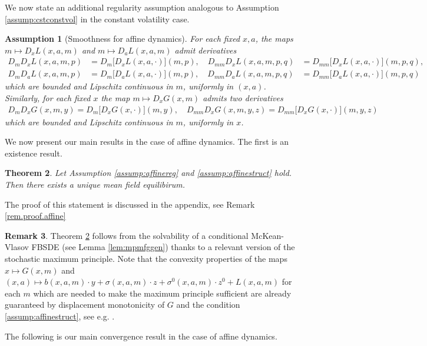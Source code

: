 \documentclass[11pt,reqno]{amsart}
\numberwithin{equation}{section}
\newtheorem{theorem}{Theorem}[section]
\newtheorem{assumption}[theorem]{Assumption}
\theoremstyle{definition}
\newtheorem{remark}[theorem]{Remark}
\begin{document}
We now state an additional regularity assumption analogous to Assumption \ref{assump:cstconstvol} in the constant volatility case.

\begin{assumption}[Smoothness for affine dynamics] \label{assump:cstaffine}
For each fixed $x,a$, the maps $m \mapsto D_x  L(x,a,m)$ and $m \mapsto D_a L(x,a,m)$ admit derivatives 
\begin{align*}
D_m D_x L(x,a,m,p) &= D_m\big[D_x L(x,a,\cdot)](m,p), \quad 
D_{mm} D_x L(x,a,m,p,q) &= D_{mm} \big[D_x L(x,a,\cdot)\big](m,p,q),
\\
D_m D_a L(x,a,m,p) &= D_m\big[D_a L(x,a,\cdot)](m,p), \quad 
D_{mm} D_a L(x,a,m,p,q) &= D_{mm} \big[D_a L(x,a,\cdot)\big](m,p,q)
\end{align*}
which are bounded and Lipschitz continuous in $m$, uniformly in $(x,a)$. Similarly, for each fixed $x$ the map $m \mapsto D_x G(x,m)$ admits two derivatives 
\begin{align*}
D_m D_x G(x,m,y) = D_m\big[D_x G(x,\cdot)](m,y), \quad D_{mm} D_x G(x,m,y,z) = D_{mm} \big[D_x G(x,\cdot)\big](m,y,z)
\end{align*}
which are bounded and Lipschitz continuous in $m$, uniformly in $x$. 
\end{assumption}

We now present our main results in the case of affine dynamics. The first is an existence result.


\begin{theorem} \label{thm:existenceaffine}
Let Assumption \ref{assump:affinereg} and \ref{assump:affinestruct} hold. Then there exists a unique mean field equilibirum.
\end{theorem}

The proof of this statement is discussed in the appendix, see Remark \ref{rem.proof.affine}
\begin{remark}
  Theorem \ref{thm:existenceaffine} follows from the solvability of a conditional McKean-Vlasov FBSDE (see Lemma \ref{lem:mpmfggen}) thanks to a relevant version of the stochastic maximum principle.
  Note that the convexity properties of the maps $x\mapsto G(x,m)$  and $(x,a)\mapsto b(x,a,m) \cdot y + \sigma(x,a,m) \cdot z + \sigma^0(x,a,m) \cdot z^0 + L(x,a,m)$ for each $m$ which are needed to make the maximum principle sufficient are already guaranteed by displacement monotonicity of $G$ and the condition \eqref{assump:affinestruct}, see e.g. \cite{Mes-Mou21}.
\end{remark}
The following is our main convergence result in the case of affine dynamics.
\end{document}
